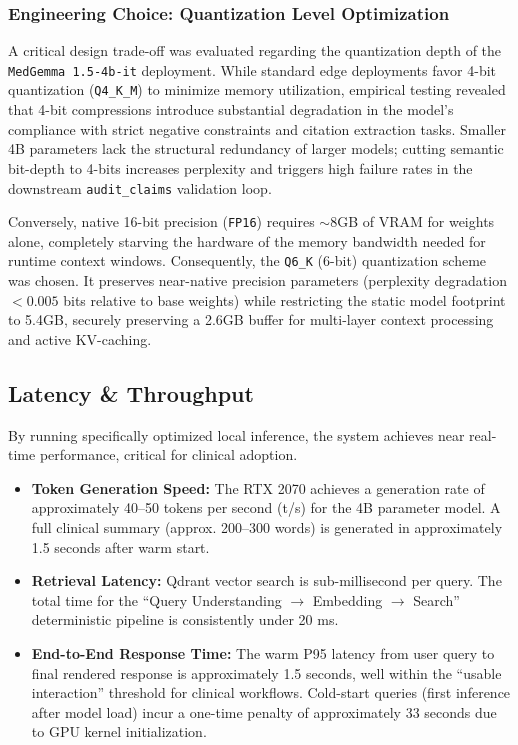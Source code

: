 \subsubsection{Engineering Choice: Quantization Level Optimization}
A critical design trade-off was evaluated regarding the quantization depth of the \texttt{MedGemma 1.5-4b-it} deployment. While standard edge deployments favor 4-bit quantization (\texttt{Q4\_K\_M}) to minimize memory utilization, empirical testing revealed that 4-bit compressions introduce substantial degradation in the model's compliance with strict negative constraints and citation extraction tasks. Smaller 4B parameters lack the structural redundancy of larger models; cutting semantic bit-depth to 4-bits increases perplexity and triggers high failure rates in the downstream \texttt{audit\_claims} validation loop.

Conversely, native 16-bit precision (\texttt{FP16}) requires $\sim$8GB of VRAM for weights alone, completely starving the hardware of the memory bandwidth needed for runtime context windows. Consequently, the \texttt{Q6\_K} (6-bit) quantization scheme was chosen. It preserves near-native precision parameters (perplexity degradation $< 0.005$ bits relative to base weights) while restricting the static model footprint to 5.4GB, securely preserving a 2.6GB buffer for multi-layer context processing and active KV-caching.

\subsection{Latency \& Throughput}
By running specifically optimized local inference, the system achieves near real-time performance, critical for clinical adoption.

\begin{itemize}
    \item \textbf{Token Generation Speed:} The RTX 2070 achieves a generation rate of approximately 40--50 tokens per second (t/s) for the 4B parameter model. A full clinical summary (approx. 200--300 words) is generated in approximately 1.5 seconds after warm start.
    \item \textbf{Retrieval Latency:} Qdrant vector search is sub-millisecond per query. The total time for the ``Query Understanding $\rightarrow$ Embedding $\rightarrow$ Search'' deterministic pipeline is consistently under 20 ms.
    \item \textbf{End-to-End Response Time:} The warm P95 latency from user query to final rendered response is approximately 1.5 seconds, well within the ``usable interaction'' threshold for clinical workflows. Cold-start queries (first inference after model load) incur a one-time penalty of approximately 33 seconds due to GPU kernel initialization.
\end{itemize}

